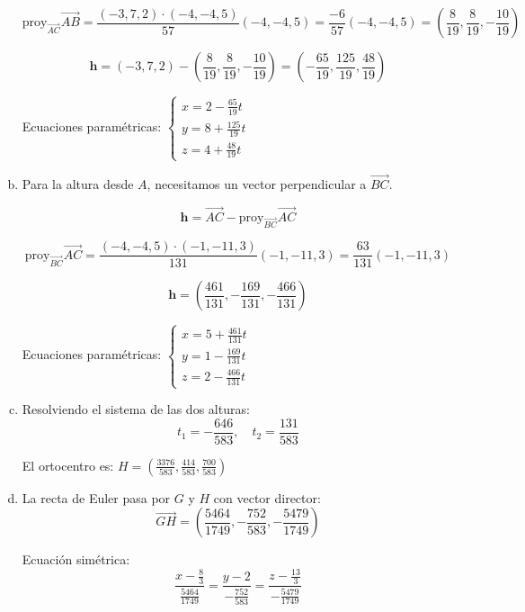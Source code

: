 \begin{prob}
\begin{myproof}
\begin{enumerate}[a)]
$$\text{proy}_{\overrightarrow{AC}}\overrightarrow{AB} = \frac{(-3,7,2) \cdot (-4,-4,5)}{57}(-4,-4,5) = \frac{-6}{57}(-4,-4,5) = \left(\frac{8}{19}, \frac{8}{19}, -\frac{10}{19}\right)$$

$$\mathbf{h} = (-3,7,2) - \left(\frac{8}{19}, \frac{8}{19}, -\frac{10}{19}\right) = \left(-\frac{65}{19}, \frac{125}{19}, \frac{48}{19}\right)$$

Ecuaciones paramétricas: $\boxed{\left\{\begin{matrix}
x = 2 - \frac{65}{19}t\\
y = 8 + \frac{125}{19}t\\
z = 4 + \frac{48}{19}t
\end{matrix}\right.}$

\item Para la altura desde $A$, necesitamos un vector perpendicular a $\overrightarrow{BC}$.

$$\mathbf{h} = \overrightarrow{AC} - \text{proy}_{\overrightarrow{BC}}\overrightarrow{AC}$$

$$\text{proy}_{\overrightarrow{BC}}\overrightarrow{AC} = \frac{(-4,-4,5) \cdot (-1,-11,3)}{131}(-1,-11,3) = \frac{63}{131}(-1,-11,3)$$

$$\mathbf{h} = \left(\frac{461}{131}, -\frac{169}{131}, -\frac{466}{131}\right)$$

Ecuaciones paramétricas: $\boxed{\left\{\begin{matrix}
x = 5 + \frac{461}{131}t\\
y = 1 - \frac{169}{131}t\\
z = 2 - \frac{466}{131}t
\end{matrix}\right.}$

\item Resolviendo el sistema de las dos alturas:
$$t_1 = -\frac{646}{583}, \quad t_2 = \frac{131}{583}$$

El ortocentro es: $\boxed{H = \left(\frac{3376}{583}, \frac{414}{583}, \frac{700}{583}\right)}$

\item La recta de Euler pasa por $G$ y $H$ con vector director:
$$\overrightarrow{GH} = \left(\frac{5464}{1749}, -\frac{752}{583}, -\frac{5479}{1749}\right)$$

Ecuación simétrica:
$$\boxed{\frac{x-\frac{8}{3}}{\frac{5464}{1749}} = \frac{y-2}{-\frac{752}{583}} = \frac{z-\frac{13}{3}}{-\frac{5479}{1749}}}$$
\end{enumerate}
\end{myproof}
\end{prob}

